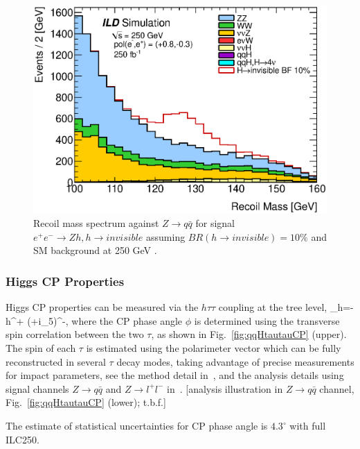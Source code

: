 \begin{figure}
\begin{center}
\includegraphics[width=0.85\hsize]{chapters/figures/ZH_qqinv250_right.eps}
\end{center}
  \caption{Recoil mass spectrum against
 $Z\to q\bar{q}$ for signal $e^+e^-\to Zh, h\to invisible$ assuming $BR(h\to invisible)=10\%$
  and SM background  at 250 GeV \cite{Ishikawa:2014}.}
  \label{fig:qqHinv250}
\end{figure}


\subsubsection{Higgs CP Properties}
\label{subsubsec:higgstautauCP}

Higgs CP properties can be measured via the
$h\tau\tau$ coupling at the tree level, 
\beq
{}_{h\tau\tau}=-h{\tau^+}
(\cos\phi+i\sin\phi\gamma_5)\tau^-,
where the CP phase angle $\phi$ is determined using the transverse spin
correlation between the two $\tau$, as shown in Fig.~\ref{fig:qqHtautauCP} (upper). 
The spin of each $\tau$ is estimated using
the polarimeter vector which can be fully reconstructed in several $\tau$ decay modes,
taking advantage of precise measurements for impact parameters, see the method detail
in~\cite{Jeans:2015vaa}, and the analysis details using signal channels 
$Z\to q\bar{q}$ and $Z\to l^+l^-$ in~\cite{Jeans:2018anq}. 
[analysis illustration in $Z\to q\bar{q}$ channel, Fig.~\ref{fig:qqHtautauCP} (lower); t.b.f.]

The estimate of statistical uncertainties for CP phase angle is $4.3^\circ$ with full ILC250.

